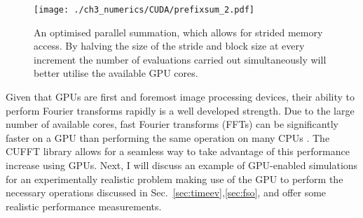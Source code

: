 \begin{figure}
    \centering
    \texttt{[image: ./ch3\_numerics/CUDA/prefixsum\_2.pdf]}
    \caption{An optimised parallel summation, which allows for strided memory access. By halving the size of the stride and block size at every increment the number of evaluations carried out simultaneously will better utilise the available GPU cores.}
    \label{fig:prefixsum2}
\end{figure}

Given that GPUs are first and foremost image processing devices, their ability to perform Fourier transforms rapidly is a well developed strength. Due to the large number of available cores, fast Fourier transforms (FFTs) can be significantly faster on a GPU than performing the same operation on many CPUs \cite{AO:Morgan_ORiordan_pra_2013}. The CUFFT library allows for a seamless way to take advantage of this performance increase using GPUs. Next, I will discuss an example of GPU-enabled simulations for an experimentally realistic problem making use of the GPU to perform the necessary operations discussed in Sec.~\ref{sec:timeev},\ref{sec:fso}, and offer some realistic performance measurements.

